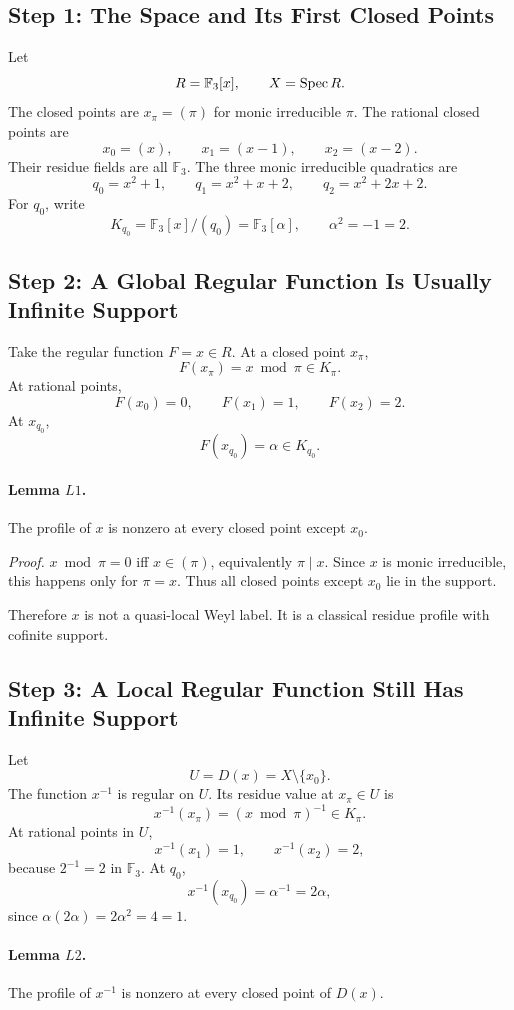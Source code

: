 \subsection{Step 1: The Space and Its First Closed Points}
Let
\[
  R=\mathbb F_3[x],\qquad X=\operatorname{Spec} R.
\]
The closed points are \(x_\pi=(\pi)\) for monic irreducible \(\pi\).  The
rational closed points are
\[
  x_0=(x),\qquad x_1=(x-1),\qquad x_2=(x-2).
\]
Their residue fields are all \(\mathbb F_3\).  The three monic irreducible
quadratics are
\[
  q_0=x^2+1,\qquad q_1=x^2+x+2,\qquad q_2=x^2+2x+2.
\]
For \(q_0\), write
\[
  K_{q_0}=\mathbb F_3[x]/(q_0)=\mathbb F_3[\alpha],
  \qquad \alpha^2=-1=2.
\]

\subsection{Step 2: A Global Regular Function Is Usually Infinite Support}
Take the regular function \(F=x\in R\).  At a closed point \(x_\pi\),
\[
  F(x_\pi)=x\bmod\pi\in K_\pi.
\]
At rational points,
\[
  F(x_0)=0,\qquad F(x_1)=1,\qquad F(x_2)=2.
\]
At \(x_{q_0}\),
\[
  F(x_{q_0})=\alpha\in K_{q_0}.
\]
\paragraph{Lemma \(L1\).}
The profile of \(x\) is nonzero at every closed point except \(x_0\).

\emph{Proof.}
\(x\bmod\pi=0\) iff \(x\in(\pi)\), equivalently \(\pi\mid x\).  Since \(x\) is
monic irreducible, this happens only for \(\pi=x\).  Thus all closed points
except \(x_0\) lie in the support.

Therefore \(x\) is not a quasi-local Weyl label.  It is a classical residue
profile with cofinite support.

\subsection{Step 3: A Local Regular Function Still Has Infinite Support}
Let
\[
  U=D(x)=X\setminus\{x_0\}.
\]
The function \(x^{-1}\) is regular on \(U\).  Its residue value at \(x_\pi\in U\)
is
\[
  x^{-1}(x_\pi)=(x\bmod\pi)^{-1}\in K_\pi.
\]
At rational points in \(U\),
\[
  x^{-1}(x_1)=1,\qquad x^{-1}(x_2)=2,
\]
because \(2^{-1}=2\) in \(\mathbb F_3\).  At \(q_0\),
\[
  x^{-1}(x_{q_0})=\alpha^{-1}=2\alpha,
\]
since \(\alpha(2\alpha)=2\alpha^2=4=1\).
\paragraph{Lemma \(L2\).}
The profile of \(x^{-1}\) is nonzero at every closed point of \(D(x)\).


